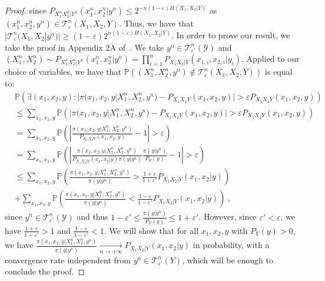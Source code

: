 \begin{proof}
        since $P_{X_1^nX_2^n|Y^n}(x_1^n,x_2^n|y^n) \leq 2^{-n(1-\varepsilon)H(X_1,X_2|Y)}$ as $(x_1^n,x_2^n,y^n) \in \mathcal{T}^n_{\varepsilon}(X_1,X_2,Y)$. Thus, we have that $|\mathcal{T}^n_{\varepsilon}(X_1,X_2|y^n)| \geq (1-\varepsilon)2^{n(1-\varepsilon)H(X_1,X_2|Y)}$. In order to prove our result, we take the proof in Appendix 2A of~\cite{GK11}. We take $y^n \in \mathcal{T}^n_{\varepsilon'}(\mathcal{Y})$ and $(X_1^n,X_2^n) \sim P_{X_1^nX_2^n|Y^n}(x_1^n,x_2^n|y^n) = \prod_{i=1}^nP_{X_1X_2|Y}(x_{1,i},x_{2,i}|y_i)$. Applied to our choice of variables, we have that $\mathbb{P}\left((X_1^n,X_2^n,y^n) \notin \mathcal{T}^n_{\varepsilon}(X_1,X_2,Y) \right)$ is equal to:
        \begin{equation}
          \begin{aligned}
            &\mathbb{P}\left(\exists (x_1,x_2,y) : |\pi(x_1,x_2,y|X_1^n,X_2^n,y^n) - P_{X_1X_2Y}(x_1,x_2,y)| > \varepsilon P_{X_1X_2Y}(x_1,x_2,y) \right) \\
            &\leq \sum_{x_1,x_2,y} \mathbb{P}\left(|\pi(x_1,x_2,y|X_1^n,X_2^n,y^n) - P_{X_1X_2Y}(x_1,x_2,y)| > \varepsilon P_{X_1X_2Y}(x_1,x_2,y) \right) \\
            &= \sum_{x_1,x_2,y} \mathbb{P}\left(\left|\frac{\pi(x_1,x_2,y|X_1^n,X_2^n,y^n)}{P_{X_1X_2Y}(x_1,x_2,y)} - 1\right| > \varepsilon \right) \\
            &= \sum_{x_1,x_2,y} \mathbb{P}\left(\left|\frac{\pi(x_1,x_2,y|X_1^n,X_2^n,y^n)}{P_{X_1X_2|Y}(x_1,x_2|y)\pi(y|y^n)}\frac{\pi(y|y^n)}{P_Y(y)} - 1\right| > \varepsilon \right) \\
            &\leq \sum_{x_1,x_2,y} \mathbb{P}\left(\frac{\pi(x_1,x_2,y|X_1^n,X_2^n,y^n)}{\pi(y|y^n)} > \frac{1+\varepsilon}{1+\varepsilon'}P_{X_1X_2|Y}(x_1,x_2|y) \right)\\
            &+ \sum_{x_1,x_2,y} \mathbb{P}\left(\frac{\pi(x_1,x_2,y|X_1^n,X_2^n,y^n)}{\pi(y|y^n)} < \frac{1-\varepsilon}{1-\varepsilon'}P_{X_1X_2|Y}(x_1,x_2|y) \right) \ ,
          \end{aligned}
        \end{equation}
        since $y^n \in  \mathcal{T}^n_{\varepsilon'}(\mathcal{Y})$ and thus $1-\varepsilon' \leq \frac{\pi(y|y^n)}{P_Y(y)} \leq 1+\varepsilon'$. However, since $\varepsilon' < \varepsilon$, we have $\frac{1+\varepsilon}{1+\varepsilon'} > 1$ and $\frac{1-\varepsilon}{1-\varepsilon'} < 1$. We will show that for all $x_1,x_2,y$ with $P_Y(y) > 0$, we have $\frac{\pi(x_1,x_2,y|X_1^n,X_2^n,y^n)}{\pi(y|y^n)} \underset{n \rightarrow +\infty}{\rightarrow} P_{X_1X_2|Y}(x_1,x_2|y)$ in probability, with a convergence rate independent from $y^n \in \mathcal{T}^n_{\varepsilon'}(Y)$, which will be enough to conclude the proof.


\end{proof}
